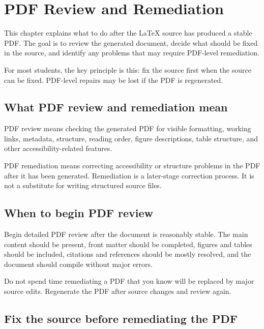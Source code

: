 
\chapter{PDF Review and Remediation}
\label{chap:pdf-review-remediation}

This chapter explains what to do after the \LaTeX{} source has produced a stable PDF. The goal is to review the generated document, decide what should be fixed in the source, and identify any problems that may require PDF-level remediation.

For most students, the key principle is this: fix the source first when the source can be fixed. PDF-level repairs may be lost if the PDF is regenerated.

\section{What PDF review and remediation mean}
\label{sec:pdf-review-remediation-mean}

PDF review means checking the generated PDF for visible formatting, working links, metadata, structure, reading order, figure descriptions, table structure, and other accessibility-related features.

PDF remediation means correcting accessibility or structure problems in the PDF after it has been generated. Remediation is a later-stage correction process. It is not a substitute for writing structured source files.

\section{When to begin PDF review}
\label{sec:when-begin-pdf-review}

Begin detailed PDF review after the document is reasonably stable. The main content should be present, front matter should be completed, figures and tables should be included, citations and references should be mostly resolved, and the document should compile without major errors.

Do not spend time remediating a PDF that you know will be replaced by major source edits. Regenerate the PDF after source changes and review again.

\section{Fix the source before remediating the PDF}
\label{sec:fix-source-before-remediation}

